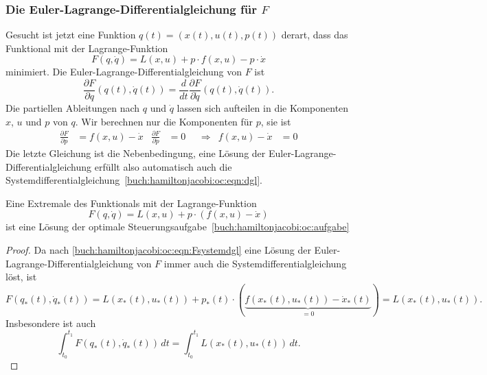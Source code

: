 %
%
\subsubsection{Die Euler-Lagrange-Differentialgleichung für $F$}
Gesucht ist jetzt eine Funktion $q(t)=(x(t),u(t),p(t))$ derart,
dass das Funktional mit der Lagrange-Funktion
\[
F(q,\dot{q})
=
L(x,u) +p\cdot f(x,u) - p\cdot \dot{x}
\]
minimiert.
Die Euler-Lagrange-Differentialgleichung von $F$ ist
\begin{equation}
\frac{\partial F}{\partial q}(q(t),\dot{q}(t))
=
\frac{d}{dt}
\frac{\partial F}{\partial \dot{q}}(q(t),\dot{q}(t)).
\label{buch:hamiltonjacobi:oc:eqn:Feulerlagrange}
\end{equation}
Die partiellen Ableitungen nach $q$ und $\dot{q}$ lassen sich aufteilen
in die Komponenten $x$, $u$ und $p$ von $q$.
Wir berechnen nur die Komponenten für $p$, sie ist
\begin{align}
\frac{\partial F}{\partial p}
&=
f(x,u)
-
\dot{x}
&
\frac{\partial F}{\partial \dot{p}}
&=
0
&&\Rightarrow&
f(x,u)-\dot{x}&=0
\label{buch:hamiltonjacobi:oc:eqn:Fsystemdgl}
\end{align}
Die letzte Gleichung ist die Nebenbedingung, eine Lösung der
Euler-Lagrange-Differential\-gleichung erfüllt also automatisch auch die
Systemdifferentialgleichung~\eqref{buch:hamiltonjacobi:oc:eqn:dgl}.

\begin{satz}
Eine Extremale des Funktionals mit der Lagrange-Funktion
\begin{equation}
F(q,\dot{q}) = L(x,u) + p\cdot(f(x,u) - \dot{x})
\label{buch:hamiltonjacobi:oc:optF}
\end{equation}
ist eine Lösung der optimale
Steuerungsaufgabe~\ref{buch:hamiltonjacobi:oc:aufgabe}
\end{satz}

\begin{proof}
Da nach
\eqref{buch:hamiltonjacobi:oc:eqn:Fsystemdgl}
eine Lösung der Euler-Lagrange-Differentialgleichung von $F$ immer
auch die Systemdifferentialgleichung löst, ist 
\begin{equation*}
F(q_*(t),\dot{q}_*(t))
=
L(x_*(t),u_*(t))
+
p_*(t)\cdot (
\underbrace{f(x_*(t),u_*(t))-\dot{x}_*(t)}_{\displaystyle=0})
=
L(x_*(t),u_*(t)).
\end{equation*}
Insbesondere ist auch
\[
\int_{t_0}^{t_1}
F(q_*(t),\dot{q}_*(t))
\,dt
=
\int_{t_0}^{t_1}
L(x_*(t),u_*(t))
\,dt.
\]
\end{proof}

